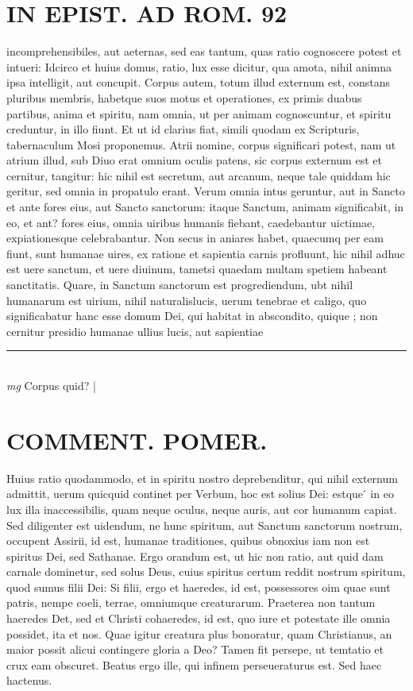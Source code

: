 \documentclass{article}
\begin{document}
\begin{pages}
\section*{IN EPIST. AD ROM.  92 }
\marginpar{[ p.]}\pstart incomprehensibiles, aut aeternas, sed eas tantum, quas ratio cognoscere potest et intueri: Idcirco et huius domus, ratio, lux esse dicitur, qua amota, nihil animna ipsa intelligit, aut concupit. Corpus autem, totum illud externum est, constans pluribus membris, habetque suos motus et operationes, ex primis duabus partibus, anima et spiritu, nam omnia, ut per animam cognoscuntur, et spiritu creduntur, in illo fiunt. Et ut id clarius fiat, simili quodam ex Scripturis, tabernaculum Mosi proponemus. Atrii nomine, corpus significari potest, nam ut atrium illud, sub Diuo erat omnium oculis patens, sic corpus externum est et cernitur, tangitur: hic nihil est secretum, aut arcanum, neque tale quiddam hic geritur, sed omnia in propatulo erant. Verum omnia intus geruntur, aut in Sancto et ante fores eius, aut Sancto sanctorum: itaque Sanctum, animam significabit, in eo, et ant? fores eius, omnia uiribus humanis fiebant, caedebantur uictimae, expiationesque celebrabantur. Non secus in aniares habet, quaecumq per eam fiunt, sunt humanae uires, ex ratione et sapientia carnis profluunt, hic nihil adhuc est uere sanctum, et uere diuinum, tametsi quaedam multam spetiem habeant sanctitatis. Quare, in Sanctum sanctorum est progrediendum, ubt nihil humanarum est uirium, nihil naturalislucis, uerum tenebrae et caligo, quo significabatur hanc esse domum Dei, qui habitat in abscondito, quique ; non cernitur presidio humanae ullius lucis, aut sapientiae  \pend
\vspace{0.5cm}\noindent
\vspace{0.2cm}\rule{1cm}{0.2pt}\\ 
\hspace{0.2cm}\textit{mg}
\footnotesize Corpus quid? 
\normalsize| 
\section*{COMMENT. POMER.  }\pstart Huius ratio quodammodo, et in spiritu nostro deprebenditur, qui nihil externum admittit, uerum quicquid continet per Verbum, hoc est solius Dei: estque ́ in eo lux illa inaccessibilis, quam neque oculus, neque  auris, aut cor humanum capiat. Sed diligenter est uidendum, ne hunc spiritum, aut Sanctum sanctorum nostrum, occupent Assirii, id est, humanae traditiones, quibus obnoxius iam non est spiritus Dei, sed Sathanae. Ergo orandum est, ut hic non ratio, aut quid dam carnale dominetur, sed solus Deus, cuius spiritus certum reddit nostrum spiritum, quod sumus filii Dei: Si filii, ergo et haeredes, id est, possessores oim quae sunt patris, nempe coeli, terrae, omniumque creaturarum. Praeterea non tantum haeredes Det, sed et Christi cohaeredes, id est, quo iure et potestate ille omnia possidet, ita et nos. Quae igitur creatura plus bonoratur, quam Christianus, an maior possit alicui contingere gloria a Deo? Tamen fit persepe, ut temtatio et crux eam obscuret. Beatus ergo ille, qui infinem perseueraturus est. Sed haec hactenus.   \pend
{}
{}

\end{pages}
\end{document}
